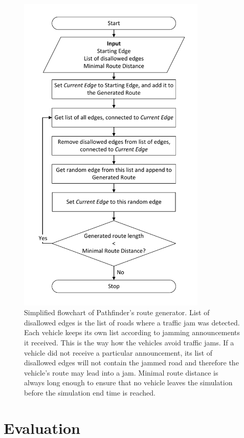 \documentclass[]{nsm-thesis}
\begin{document}
\begin{figure}
	\centering
	\includegraphics[width=0.8\textwidth]{figures/Pathfinder.pdf}
	\caption{Simplified flowchart of Pathfinder's route generator. List of disallowed edges is the list of roads where a traffic jam was detected. Each vehicle keeps its own list according to jamming announcements it received. This is the way how the vehicles avoid traffic jams. If a vehicle did not receive a particular announcement, its list of disallowed edges will not contain the jammed road and therefore the vehicle's route may lead into a jam. Minimal route distance is always long enough to ensure that no vehicle leaves the simulation before the simulation end time is reached.}
	\label{fig:Pathfinder}
\end{figure}

\chapter{Evaluation}
\end{document}
